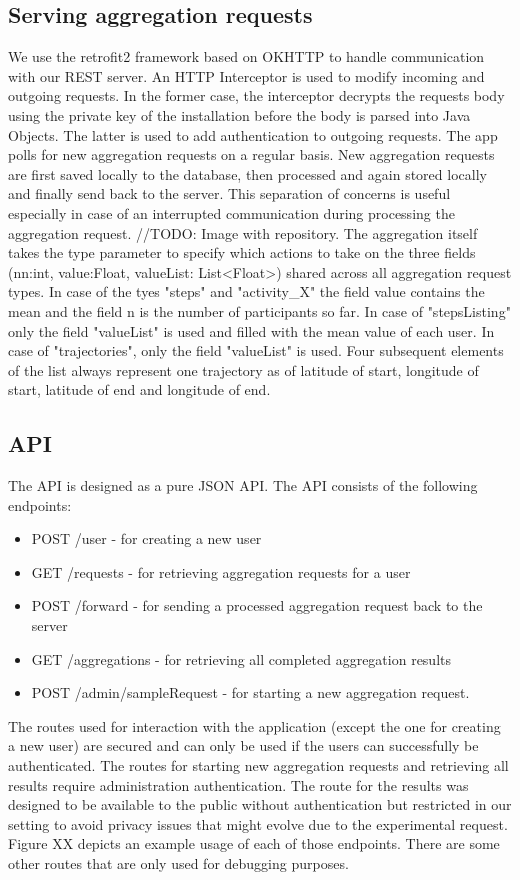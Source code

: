 \subsection{Serving aggregation requests}
We use the retrofit2 framework based on OKHTTP to handle communication with our REST server. An HTTP Interceptor is used to modify incoming and outgoing requests. In the former case, the interceptor decrypts the requests body using the private key of the installation before the body is parsed into Java Objects. The latter is used to add authentication to outgoing requests.
The app polls for new aggregation requests on a regular basis. New aggregation requests are first saved locally to the database, then processed and again stored locally and finally send back to the server. This separation of concerns is useful especially in case of an interrupted communication during processing the aggregation request. //TODO: Image with repository.
The aggregation itself takes the type parameter to specify which actions to take on the three fields (nn:int, value:Float, valueList: List<Float>) shared across all aggregation request types. In case of the tyes "steps" and "activity\_X" the field value contains the mean and the field n is the number of participants so far. In case of "stepsListing" only the field "valueList" is used and filled with the mean value of each user. In case of "trajectories", only the field "valueList" is used. Four subsequent elements of the list always represent one trajectory as of latitude of start, longitude of start, latitude of end and longitude of end.

\subsection{API}
The API is designed as a pure JSON API.
The API consists of the following endpoints:
\begin{itemize}
	\item POST /user - for creating a new user
	\item GET /requests - for retrieving aggregation requests for a user
	\item POST /forward - for sending a processed aggregation request back to the server
	\item GET /aggregations - for retrieving all completed aggregation results
	\item POST /admin/sampleRequest - for starting a new aggregation request.
\end{itemize}

The routes used for interaction with the application (except the one for creating a new user) are secured and can only be used if the users can successfully be authenticated. The routes for starting new aggregation requests and retrieving all results require administration authentication. The route for the results was designed to be available to the public without authentication but restricted in our setting to avoid privacy issues that might evolve due to the experimental request.
Figure XX depicts an example usage of each of those endpoints. There are some other routes that are only used for debugging purposes. 


